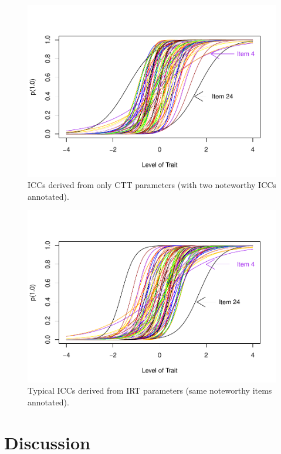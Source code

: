\documentclass[
  jou]{apa6}
\begin{document}
\begin{figure}
\centering
\includegraphics{ICC_project_files/figure-latex/cttcurves-1.pdf}
\caption{\label{fig:cttcurves}ICCs derived from only CTT parameters (with two noteworthy ICCs annotated).}
\end{figure}

\begin{figure}
\centering
\includegraphics{ICC_project_files/figure-latex/irtcurves-1.pdf}
\caption{\label{fig:irtcurves}Typical ICCs derived from IRT parameters (same noteworthy items annotated).}
\end{figure}

\hypertarget{discussion}{%
\section{Discussion}\label{discussion}}
\end{document}
